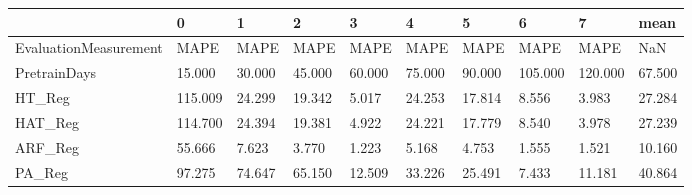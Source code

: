 \begin{tabular}{llllllllll}
\toprule
{} &       0 &      1 &      2 &      3 &      4 &      5 &       6 &       7 &   mean \\
\midrule
EvaluationMeasurement &    MAPE &   MAPE &   MAPE &   MAPE &   MAPE &   MAPE &    MAPE &    MAPE &    NaN \\
PretrainDays          &  15.000 & 30.000 & 45.000 & 60.000 & 75.000 & 90.000 & 105.000 & 120.000 & 67.500 \\
HT\_Reg                & 115.009 & 24.299 & 19.342 &  5.017 & 24.253 & 17.814 &   8.556 &   3.983 & 27.284 \\
HAT\_Reg               & 114.700 & 24.394 & 19.381 &  4.922 & 24.221 & 17.779 &   8.540 &   3.978 & 27.239 \\
ARF\_Reg               &  55.666 &  7.623 &  3.770 &  1.223 &  5.168 &  4.753 &   1.555 &   1.521 & 10.160 \\
PA\_Reg                &  97.275 & 74.647 & 65.150 & 12.509 & 33.226 & 25.491 &   7.433 &  11.181 & 40.864 \\
\bottomrule
\end{tabular}
